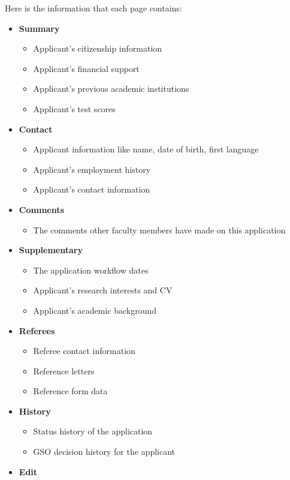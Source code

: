 \documentclass[titlepage]{article}
\begin{document}
Here is the information that each page contains:
\begin{itemize}
\item \textbf{\textsf{Summary}}
  \begin{itemize}
    \item Applicant's citizenship information
    \item Applicant's financial support
    \item Applicant's previous academic institutions
    \item Applicant's test scores
  \end{itemize}
\item \textbf{\textsf{Contact}}
  \begin{itemize}
    \item Applicant information like name, date of birth, first language
    \item Applicant's employment history
    \item Applicant's contact information
  \end{itemize}
\item \textbf{\textsf{Comments}}
  \begin{itemize}
    \item The comments other faculty members have made on this application
  \end{itemize}
\item \textbf{\textsf{Supplementary}}
  \begin{itemize}
    \item The application workflow dates
    \item Applicant's research interests and CV
    \item Applicant's academic background
  \end{itemize}
\item \textbf{\textsf{Referees}}
  \begin{itemize}
    \item Referee contact information
    \item Reference letters
    \item Reference form data
  \end{itemize}
\item \textbf{\textsf{History}}
  \begin{itemize}
    \item Status history of the application
    \item GSO decision history for the applicant
  \end{itemize}
\item \textbf{\textsf{Edit}}

\end{itemize}
\end{document}
